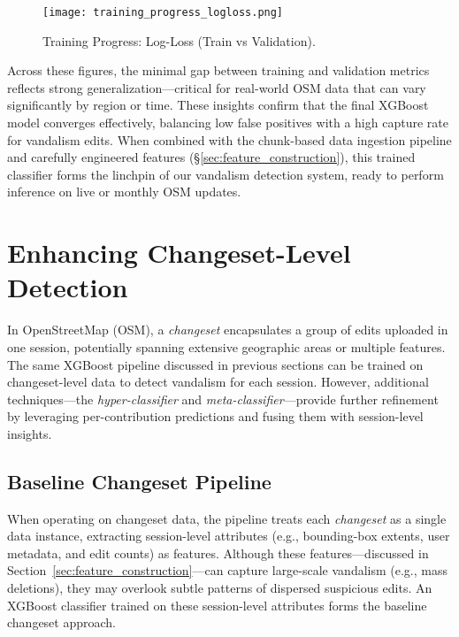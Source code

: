\documentclass[
    13pt, %
    a4paper, %
    DIV14, %
    listof=totoc, %
    bibliography=totoc, %
    index=totoc, %
    headsepline
]{scrreprt}
\begin{document}
\begin{figure}[H]
    \centering
    \texttt{[image: training\_progress\_logloss.png]}
    \caption{Training Progress: Log-Loss (Train vs Validation).}
    \label{fig:training_progress_logloss}
\end{figure}

Across these figures, the minimal gap between training and validation metrics reflects strong
generalization—critical for real-world OSM data that can vary significantly by region or time.
These insights confirm that the final XGBoost model converges effectively, balancing low false
positives with a high capture rate for vandalism edits. When combined with the chunk-based data ingestion pipeline and carefully engineered features (\S\ref{sec:feature_construction}), this trained classifier forms
the linchpin of our vandalism detection system, ready to perform inference on live or monthly
OSM updates.


\newpage
\section{Enhancing Changeset-Level Detection}
\label{sec:changeset_level_detection}

In OpenStreetMap (OSM), a \emph{changeset} encapsulates a group of edits uploaded in one session, potentially spanning extensive geographic areas or multiple features. The same XGBoost pipeline discussed in previous sections can be trained on changeset-level data to detect vandalism for each session. However, additional techniques—the \emph{hyper-classifier} and \emph{meta-classifier}—provide further refinement by leveraging per-contribution predictions and fusing them with session-level insights.

\subsection{Baseline Changeset Pipeline}
\label{subsec:baseline_changeset_pipeline}

When operating on changeset data, the pipeline treats each \emph{changeset} as a single data instance, extracting session-level attributes (e.g., bounding-box extents, user metadata, and edit counts) as features. Although these features—discussed in Section~\ref{sec:feature_construction}—can capture large-scale vandalism (e.g., mass deletions), they may overlook subtle patterns of dispersed suspicious edits. An XGBoost classifier trained on these session-level attributes forms the baseline changeset approach.
\end{document}
